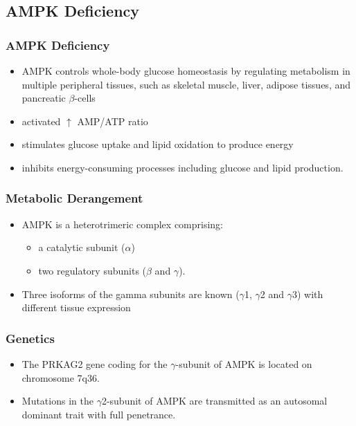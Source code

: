 \documentclass{scrartcl}
\begin{document}
\subsection{AMPK Deficiency}
\label{sec:org8169c4c}
\subsubsection{AMPK Deficiency}
\label{sec:orgcd9fd76}
\begin{itemize}
\item AMPK controls whole-body glucose homeostasis by regulating metabolism in multiple peripheral tissues, such as
skeletal muscle, liver, adipose tissues, and pancreatic \(\beta\)-cells
\item activated \(\uparrow\) AMP/ATP ratio
\item stimulates glucose uptake and lipid oxidation to produce energy
\item inhibits energy-consuming processes including glucose and lipid production.
\end{itemize}

\subsubsection{Metabolic Derangement}
\label{sec:org8c43ffe}
\begin{itemize}
\item AMPK is a heterotrimeric complex comprising:
\begin{itemize}
\item a catalytic subunit (\(\alpha\))
\item two regulatory subunits (\(\beta\) and \(\gamma\)).
\end{itemize}
\item Three isoforms of the gamma subunits are known (\(\gamma\)1, \(\gamma\)2 and \(\gamma\)3) with different tissue
expression
\end{itemize}

\subsubsection{Genetics}
\label{sec:orgbedbb6f}
\begin{itemize}
\item The PRKAG2 gene coding for the \(\gamma\)-subunit of AMPK is located on chromosome 7q36.
\item Mutations in the \(\gamma\)2-subunit of AMPK are transmitted as an
autosomal dominant trait with full penetrance.
\end{itemize}
\end{document}

